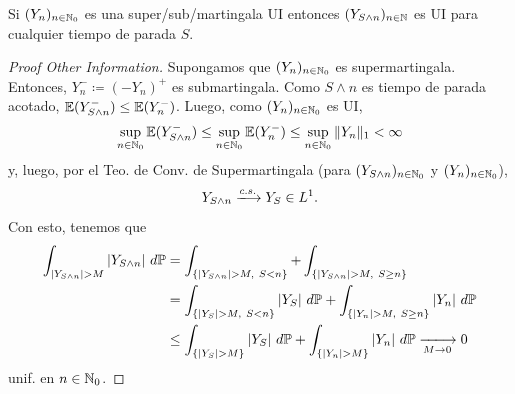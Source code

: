 
\begin{lemma}
	Si $(Y_{n})_{n \in \mathbb{N}_{0}}$ es una super/sub/martingala UI entonces $(Y_{S \wedge n})_{n \in \mathbb{N}}$ es UI para cualquier tiempo de parada $S$.
\end{lemma}
\begin{proof}[Proof Other Information]
	Supongamos que $(Y_{n})_{n \in \mathbb{N}_{0}}$ es supermartingala. Entonces, $Y_{n}^{-} \coloneq (-Y_{n})^{+}$ es submartingala. Como $S \wedge n$ es tiempo de parada acotado, $\mathbb{E}(Y_{S \wedge n}^{-}) \leq \mathbb{E}(Y_{n}^{-})$. Luego, como $(Y_{n})_{n \in \mathbb{N}_{0}}$ es UI,
	\[ \sup_{n \in \mathbb{N}_{0}} \mathbb{E}(Y_{S \wedge n}^{-}) \leq \sup_{n \in \mathbb{N}_{0}} \mathbb{E}(Y_{n}^{-}) \leq \sup_{n \in \mathbb{N}_{0}} \| Y_{n} \|_{1} < \infty \]
	y, luego, por el Teo. de Conv. de Supermartingala (para $(Y_{S \wedge n})_{n \in \mathbb{N}_{0}}$ y $(Y_{n})_{n \in \mathbb{N}_{0}}$),
	\[ Y_{S \wedge n} \xlongrightarrow{c.s.} Y_{S} \in L^{1}. \]
	Con esto, tenemos que
	\begin{align*}
		\int_{|Y_{S \wedge n}| > M} |Y_{S \wedge n}| \ d \mbb{P} &= \int_{\{|Y_{S \wedge n}| > M,\ S < n\}} + \int_{\{|Y_{S \wedge n}| > M,\ S \geq n\}} \\
		&= \int_{\{|Y_{S}| > M,\ S < n\}} |Y_{S}| \ d\mbb{P} + \int_{\{|Y_{n}| > M,\ S \geq n\}} |Y_{n}| \ d\mbb{P} \\
		&\leq \int_{\{|Y_{S}| > M\}} |Y_{S}| \ d\mbb{P} + \int_{\{|Y_{n}| > M\}} |Y_{n}| \ d\mbb{P} \xlongrightarrow[M \to 0]{} 0
	\end{align*}
	unif. en $n \in \mathbb{N}_{0}$.
\end{proof}

